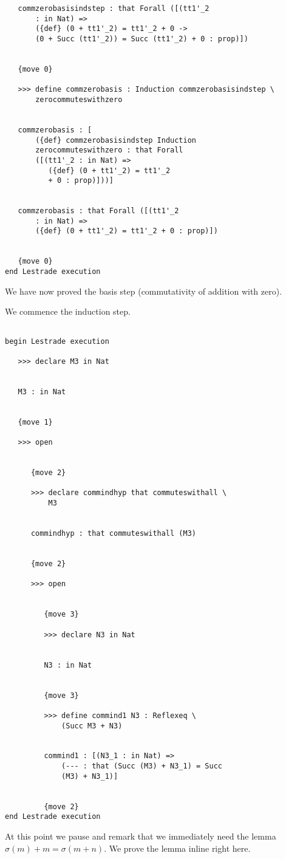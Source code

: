 \documentclass[12pt]{article}
\begin{document}
\begin{verbatim}
   commzerobasisindstep : that Forall ([(tt1'_2 
       : in Nat) => 
       ({def} (0 + tt1'_2) = tt1'_2 + 0 -> 
       (0 + Succ (tt1'_2)) = Succ (tt1'_2) + 0 : prop)])


   {move 0}

   >>> define commzerobasis : Induction commzerobasisindstep \
       zerocommuteswithzero


   commzerobasis : [
       ({def} commzerobasisindstep Induction 
       zerocommuteswithzero : that Forall 
       ([(tt1'_2 : in Nat) => 
          ({def} (0 + tt1'_2) = tt1'_2 
          + 0 : prop)]))]


   commzerobasis : that Forall ([(tt1'_2 
       : in Nat) => 
       ({def} (0 + tt1'_2) = tt1'_2 + 0 : prop)])


   {move 0}
end Lestrade execution
\end{verbatim}

We have now proved the basis step (commutativity of addition with zero).

We commence the induction step.

\begin{verbatim}

begin Lestrade execution

   >>> declare M3 in Nat


   M3 : in Nat


   {move 1}

   >>> open


      {move 2}

      >>> declare commindhyp that commuteswithall \
          M3


      commindhyp : that commuteswithall (M3)


      {move 2}

      >>> open


         {move 3}

         >>> declare N3 in Nat


         N3 : in Nat


         {move 3}

         >>> define commind1 N3 : Reflexeq \
             (Succ M3 + N3)


         commind1 : [(N3_1 : in Nat) => 
             (--- : that (Succ (M3) + N3_1) = Succ 
             (M3) + N3_1)]


         {move 2}
end Lestrade execution
\end{verbatim}

At this point we pause and remark that we immediately need the lemma $\sigma(m)+m = \sigma(m+n)$.  We prove the lemma inline right here.
\end{document}
